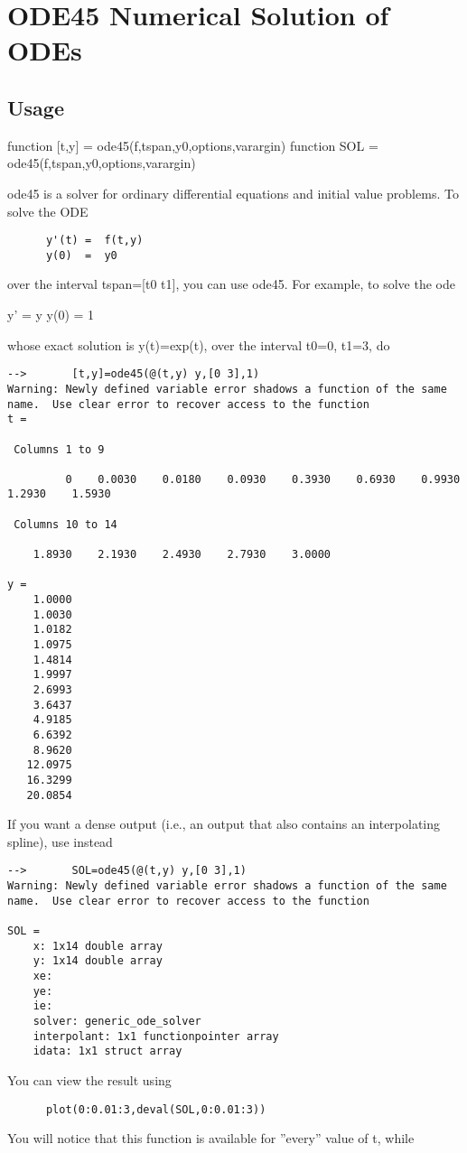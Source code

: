 \section{ODE45 Numerical Solution of ODEs}

\subsection{Usage}

 function [t,y] = ode45(f,tspan,y0,options,varargin)
 function SOL   = ode45(f,tspan,y0,options,varargin)

 ode45 is a solver for ordinary differential equations and initial value problems.
 To solve the ODE
\begin{verbatim}
      y'(t) =  f(t,y)
      y(0)  =  y0
\end{verbatim}
 over the interval tspan=[t0 t1], you can use ode45. For example, to solve
 the ode

      y'   =  y
      y(0) =  1

 whose exact solution is y(t)=exp(t), over the interval t0=0, t1=3, do
\begin{verbatim}
-->       [t,y]=ode45(@(t,y) y,[0 3],1)
Warning: Newly defined variable error shadows a function of the same name.  Use clear error to recover access to the function
t = 

 Columns 1 to 9

         0    0.0030    0.0180    0.0930    0.3930    0.6930    0.9930    1.2930    1.5930 

 Columns 10 to 14

    1.8930    2.1930    2.4930    2.7930    3.0000 

y = 
    1.0000 
    1.0030 
    1.0182 
    1.0975 
    1.4814 
    1.9997 
    2.6993 
    3.6437 
    4.9185 
    6.6392 
    8.9620 
   12.0975 
   16.3299 
   20.0854 
\end{verbatim}
 If you want a dense output (i.e., an output that also contains an interpolating
 spline), use instead
\begin{verbatim}
-->       SOL=ode45(@(t,y) y,[0 3],1)
Warning: Newly defined variable error shadows a function of the same name.  Use clear error to recover access to the function

SOL = 
    x: 1x14 double array
    y: 1x14 double array
    xe: 
    ye: 
    ie: 
    solver: generic_ode_solver
    interpolant: 1x1 functionpointer array
    idata: 1x1 struct array
\end{verbatim}
 You can view the result using
\begin{verbatim}
      plot(0:0.01:3,deval(SOL,0:0.01:3))
\end{verbatim}
 You will notice that this function is available for ''every'' value of t, while

